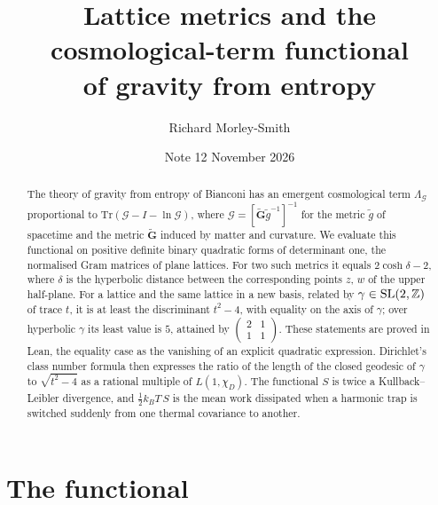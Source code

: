 \documentclass[11pt]{article}
\title{Lattice metrics and the cosmological-term functional\\ of gravity from entropy}
\author{Richard Morley-Smith}
\date{Note 12 \quad November 2026}
\begin{document}
\maketitle

\begin{abstract}
\noindent
The theory of gravity from entropy of Bianconi has an emergent cosmological term $\Lambda_{\mathcal G}$ proportional to $\mathrm{Tr}(\mathcal G-I-\ln\mathcal G)$, where $\mathcal G = [\tilde{\mathbf G}\tilde g^{-1}]^{-1}$ for the metric $\tilde g$ of spacetime and the metric $\tilde{\mathbf G}$ induced by matter and curvature.
We evaluate this functional on positive definite binary quadratic forms of determinant one, the normalised Gram matrices of plane lattices.
For two such metrics it equals $2\cosh\delta-2$, where $\delta$ is the hyperbolic distance between the corresponding points $z$, $w$ of the upper half-plane.
For a lattice and the same lattice in a new basis, related by $\gamma\in\mathrm{SL}(2,\mathbb{Z})$ of trace $t$, it is at least the discriminant $t^2-4$, with equality on the axis of $\gamma$; over hyperbolic $\gamma$ its least value is $5$, attained by $\left(\begin{smallmatrix}2&1\\1&1\end{smallmatrix}\right)$.
These statements are proved in Lean, the equality case as the vanishing of an explicit quadratic expression.
Dirichlet's class number formula then expresses the ratio of the length of the closed geodesic of $\gamma$ to $\sqrt{t^2-4}$ as a rational multiple of $L(1,\chi_D)$.
The functional $S$ is twice a Kullback--Leibler divergence, and $\tfrac12k_BT\,S$ is the mean work dissipated when a harmonic trap is switched suddenly from one thermal covariance to another.
\end{abstract}

\section{The functional}
\end{document}
